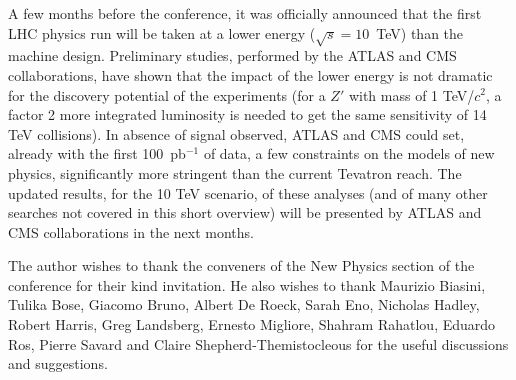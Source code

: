 \documentclass{cimento}
\begin{document}
A few months before the conference, it was officially announced 
that the first LHC physics run will be taken at a lower energy 
($\sqrt{s} = 10$~TeV) than the machine design. Preliminary 
studies, performed by the ATLAS and CMS collaborations, 
have shown that the impact of the lower energy is not dramatic for the 
discovery potential of the experiments (for a $Z'$ with mass of 1 TeV/$c^2$, 
a factor 2 more integrated luminosity is needed to get the same 
sensitivity of 14 TeV collisions). 
In absence of signal observed, ATLAS and CMS could set, already with the 
first 100~pb$^{-1}$ of data, a few constraints on the models of new physics, 
significantly more stringent than the current Tevatron reach. 
The updated results, for the 10 TeV scenario, of these analyses (and of 
many other searches not covered in this short overview) 
will be presented by ATLAS and CMS collaborations 
in the next months.


\acknowledgments
The author wishes to thank the conveners of the New Physics 
section of the conference for their kind invitation. 
He also wishes to thank Maurizio Biasini, Tulika Bose, Giacomo Bruno, Albert De Roeck, Sarah Eno, Nicholas Hadley, Robert Harris, 
Greg Landsberg, Ernesto Migliore, Shahram Rahatlou, Eduardo Ros, Pierre Savard and Claire 
Shepherd-Themistocleous  for the useful discussions and suggestions.
\end{document}

